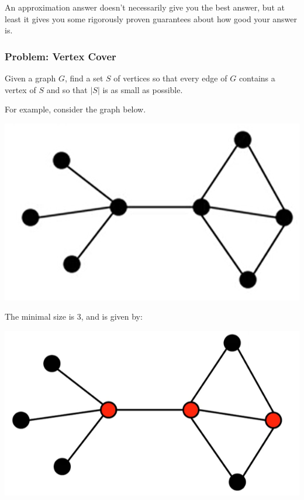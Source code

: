 \documentclass[letterpaper]{article}
\begin{document}
\bigskip 

An approximation answer doesn't necessarily give you the best answer, but at least it gives you some rigorously proven guarantees about how good your answer is. 


\subsubsection{Problem: Vertex Cover}
Given a graph $G$, find a set $S$ of vertices so that every edge of $G$ contains a vertex of $S$ and so that $|S|$ is as small as possible. 

\bigskip 

For example, consider the graph below.
\begin{center}
    \includegraphics[scale=0.5]{../assets/vertex_cov.png}
\end{center}
The minimal size is 3, and is given by: 
\begin{center}
    \includegraphics[scale=0.5]{../assets/vertex_cov_2.png}
\end{center}
\end{document}
